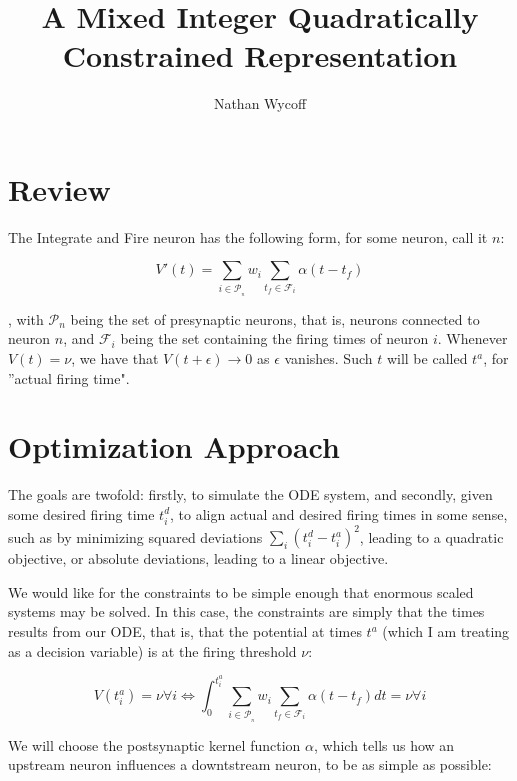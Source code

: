 \documentclass[a4paper]{article}
\title{A Mixed Integer Quadratically Constrained Representation}
\author{Nathan Wycoff}
\begin{document}
\maketitle

\section{Review}

The Integrate and Fire neuron has the following form, for some neuron, call it $n$:

\begin{equation}
    V'(t) = \sum_{i \in \mathcal{P}_{_n}} w_i \sum_{t_f \in \mathcal{F}_{i}} \alpha(t - t_f)
    \label{stdif}
\end{equation}

, with $\mathcal{P}_n$ being the set of presynaptic neurons, that is, neurons connected to neuron $n$, and $\mathcal{F}_i$ being the set containing the firing times of neuron $i$. Whenever $V(t) = \nu$, we have that $V(t + \epsilon) \to 0$ as $\epsilon$ vanishes. Such $t$ will be called $t^a$, for ''actual firing time".


\section{Optimization Approach}

The goals are twofold: firstly, to simulate the ODE system, and secondly, given some desired firing time $t^d_i$, to align actual and desired firing times in some sense, such as by minimizing squared deviations $\sum_{i} (t^d_i - t^a_i)^2$, leading to a quadratic objective, or absolute deviations, leading to a linear objective.


We would like for the constraints to be simple enough that enormous scaled systems may be solved. In this case, the constraints are simply that the times results from our ODE, that is, that the potential at times $t^a$ (which I am treating as a decision variable) is at the firing threshold $\nu$: 

\begin{equation}
    V(t^a_i) = \nu \forall i \iff \int_{0}^{t^a_i} \sum_{i \in \mathcal{P}_{_n}} w_i \sum_{t_f \in \mathcal{F}_{i}} \alpha(t - t_f) dt = \nu \forall i
    \label{origconstr}
\end{equation}

We will choose the postsynaptic kernel function $\alpha$, which tells us how an upstream neuron influences a downtstream neuron, to be as simple as possible:
\end{document}
